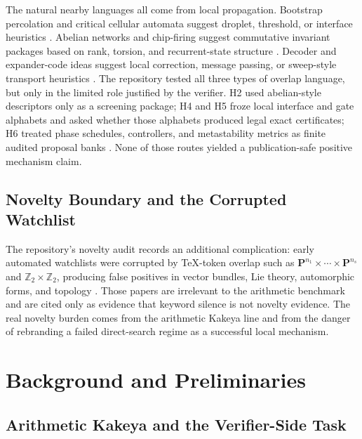 \documentclass[11pt]{article}
\theoremstyle{definition}
\begin{document}
The natural nearby languages all come from local propagation. Bootstrap percolation and critical cellular automata suggest droplet, threshold, or interface heuristics \citep{bollobas2014,hartarsky2018}. Abelian networks and chip-firing suggest commutative invariant packages based on rank, torsion, and recurrent-state structure \citep{bond2013,bond2014,bond2015}. Decoder and expander-code ideas suggest local correction, message passing, or sweep-style transport heuristics \citep{sipser1996,hemenway2013,kubica2018}. The repository tested all three types of overlap language, but only in the limited role justified by the verifier. H2 used abelian-style descriptors only as a screening package; H4 and H5 froze local interface and gate alphabets and asked whether those alphabets produced legal exact certificates; H6 treated phase schedules, controllers, and metastability metrics as finite audited proposal banks \citep{archivara_h2,archivara_h4_typed_interfaces,archivara_h5_affine_shell,archivara_h6_defect_transport,archivara_boundary_controller,archivara_metastability}. None of those routes yielded a publication-safe positive mechanism claim.

\subsection{Novelty Boundary and the Corrupted Watchlist}

The repository's novelty audit records an additional complication: early automated watchlists were corrupted by TeX-token overlap such as $\mathbf{P}^{n_1}\times\cdots\times\mathbf{P}^{n_s}$ and $\mathbb{Z}_2\times\mathbb{Z}_2$, producing false positives in vector bundles, Lie theory, automorphic forms, and topology \citep{archivara_prior_art_watchlist,archivara_prior_art_gap}. Those papers are irrelevant to the arithmetic benchmark and are cited only as evidence that keyword silence is not novelty evidence. The real novelty burden comes from the arithmetic Kakeya line and from the danger of rebranding a failed direct-search regime as a successful local mechanism.

\section{Background and Preliminaries}
\label{sec:background}

\subsection{Arithmetic Kakeya and the Verifier-Side Task}
\end{document}
